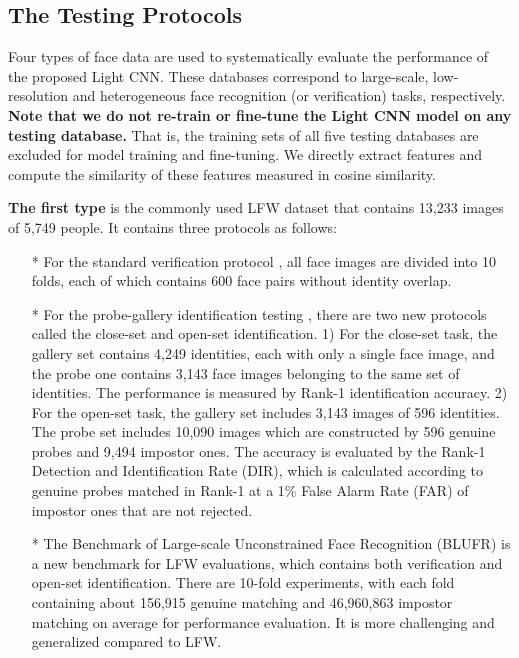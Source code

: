 \documentclass[journal,transmag]{IEEEtran}
\begin{document}
\subsection{The Testing Protocols}\label{protocols}

 Four types of face data are used to systematically evaluate the performance of the proposed Light CNN. These databases correspond to large-scale, low-resolution and heterogeneous face recognition (or verification) tasks, respectively. \textbf{Note that we do not re-train or fine-tune the Light CNN model on any testing database.} That is, the training sets of all five testing databases are excluded for model training and fine-tuning.
We directly extract features and compute the similarity of these features measured in cosine similarity.

\textbf{The first type} is the commonly used LFW dataset \cite{huang2007labeled} that contains 13,233 images of 5,749 people. It contains three protocols as follows:
\begin{itemize}\setlength{\itemsep}{1pt}
\item[*] For the standard verification protocol \cite{huang2007labeled}, all face images are divided into 10 folds, each of which contains 600 face pairs without identity overlap.
\item[*] For the probe-gallery identification testing \cite{best2014unconstrained}, there are two new protocols called the close-set and open-set identification. 1) For the close-set task, the gallery set contains 4,249 identities, each with only a single face image, and the probe one contains 3,143 face images belonging to the same set of identities. The performance is measured by Rank-1 identification accuracy. 2) For the open-set task, the gallery set includes 3,143 images of 596 identities. The probe set includes 10,090 images which are constructed by 596 genuine probes and 9,494 impostor ones. The accuracy is evaluated by the Rank-1 Detection and Identification Rate (DIR), which is calculated according to genuine probes matched in Rank-1 at a 1\% False Alarm Rate (FAR) of impostor ones that are not rejected.
\item[*] The Benchmark of Large-scale Unconstrained Face Recognition (BLUFR) \cite{DBLP:conf/icb/LiaoLYL14} is a new benchmark for LFW evaluations, which contains both verification and open-set identification. There are 10-fold experiments, with each fold containing about 156,915 genuine matching and 46,960,863 impostor matching on average for performance evaluation. It is more challenging and generalized compared to LFW.
\end{itemize}
\end{document}
